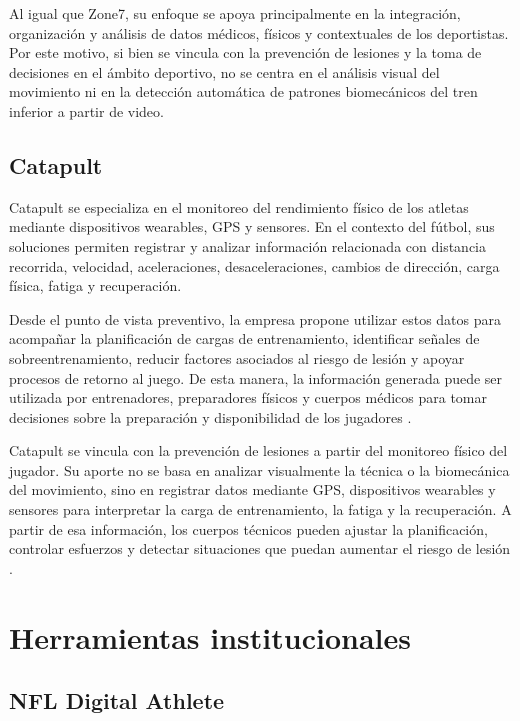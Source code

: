 Al igual que Zone7, su enfoque se apoya principalmente en la integración, organización y
análisis de datos médicos, físicos y contextuales de los deportistas. Por este motivo, si
bien se vincula con la prevención de lesiones y la toma de decisiones en el ámbito
deportivo, no se centra en el análisis visual del movimiento ni en la detección automática
de patrones biomecánicos del tren inferior a partir de video.

\subsection{Catapult}

Catapult \parencite{CatapultInjuryPrevention} se especializa en el monitoreo del rendimiento
físico de los atletas mediante dispositivos wearables, GPS y sensores. En el contexto del
fútbol, sus soluciones permiten registrar y analizar información relacionada con distancia
recorrida, velocidad, aceleraciones, desaceleraciones, cambios de dirección, carga física,
fatiga y recuperación.

Desde el punto de vista preventivo, la empresa propone utilizar estos datos para acompañar
la planificación de cargas de entrenamiento, identificar señales de sobreentrenamiento,
reducir factores asociados al riesgo de lesión y apoyar procesos de retorno al juego. De
esta manera, la información generada puede ser utilizada por entrenadores, preparadores
físicos y cuerpos médicos para tomar decisiones sobre la preparación y disponibilidad de
los jugadores \parencite{CatapultInjuryPrevention}.

Catapult se vincula con la prevención de lesiones a partir del monitoreo físico del jugador.
Su aporte no se basa en analizar visualmente la técnica o la biomecánica del movimiento,
sino en registrar datos mediante GPS, dispositivos wearables y sensores para interpretar la
carga de entrenamiento, la fatiga y la recuperación. A partir de esa información, los
cuerpos técnicos pueden ajustar la planificación, controlar esfuerzos y detectar situaciones
que puedan aumentar el riesgo de lesión \parencite{CatapultInjuryPrevention}.

\section{Herramientas institucionales}

\subsection{NFL Digital Athlete}

